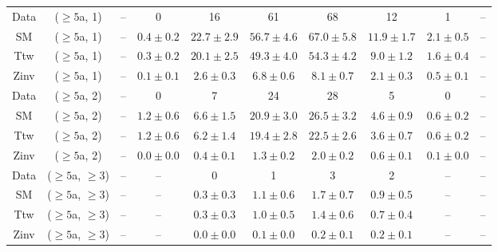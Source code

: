 \begin{table}[h!]
{\begin{tabular}{cccccccccc}
	Data & ($\ge5$a, 1) & -- & 0 & 16 & 61 & 68 & 12 & 1 & -- \\[0.5ex] 
	SM & ($\ge5$a, 1) & -- & $0.4\pm 0.2$ & $22.7\pm 2.9$ & $56.7\pm 4.6$ & $67.0\pm 5.8$ & $11.9\pm 1.7$ & $2.1\pm 0.5$ & -- \\[0.5ex] 
	Ttw & ($\ge5$a, 1) & -- & $0.3\pm 0.2$ & $20.1\pm 2.5$ & $49.3\pm 4.0$ & $54.3\pm 4.2$ & $9.0\pm 1.2$ & $1.6\pm 0.4$ & -- \\[0.5ex] 
	Zinv & ($\ge5$a, 1) & -- & $0.1\pm 0.1$ & $2.6\pm 0.3$ & $6.8\pm 0.6$ & $8.1\pm 0.7$ & $2.1\pm 0.3$ & $0.5\pm 0.1$ & -- \\[0.5ex] 
	Data & ($\ge5$a, 2) & -- & 0 & 7 & 24 & 28 & 5 & 0 & -- \\[0.5ex] 
	SM & ($\ge5$a, 2) & -- & $1.2\pm 0.6$ & $6.6\pm 1.5$ & $20.9\pm 3.0$ & $26.5\pm 3.2$ & $4.6\pm 0.9$ & $0.6\pm 0.2$ & -- \\[0.5ex] 
	Ttw & ($\ge5$a, 2) & -- & $1.2\pm 0.6$ & $6.2\pm 1.4$ & $19.4\pm 2.8$ & $22.5\pm 2.6$ & $3.6\pm 0.7$ & $0.6\pm 0.2$ & -- \\[0.5ex] 
	Zinv & ($\ge5$a, 2) & -- & $0.0\pm 0.0$ & $0.4\pm 0.1$ & $1.3\pm 0.2$ & $2.0\pm 0.2$ & $0.6\pm 0.1$ & $0.1\pm 0.0$ & -- \\[0.5ex] 
	Data & ($\ge5$a, $\ge3$) & -- & -- & 0 & 1 & 3 & 2 & -- & -- \\[0.5ex] 
	SM & ($\ge5$a, $\ge3$) & -- & -- & $0.3\pm 0.3$ & $1.1\pm 0.6$ & $1.7\pm 0.7$ & $0.9\pm 0.5$ & -- & -- \\[0.5ex] 
	Ttw & ($\ge5$a, $\ge3$) & -- & -- & $0.3\pm 0.3$ & $1.0\pm 0.5$ & $1.4\pm 0.6$ & $0.7\pm 0.4$ & -- & -- \\[0.5ex] 
	Zinv & ($\ge5$a, $\ge3$) & -- & -- & $0.0\pm 0.0$ & $0.1\pm 0.0$ & $0.2\pm 0.1$ & $0.2\pm 0.1$ & -- & -- \\[0.5ex] 
	\hline
	\hline
\end{tabular}}
\end{table}
